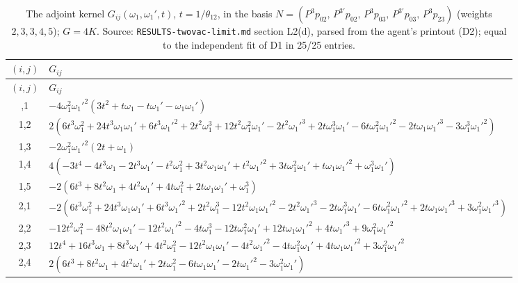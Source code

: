 \documentclass[11pt]{article}
\begin{document}
{\scriptsize
\begin{longtable}{cp{13.5cm}}
\caption{The adjoint kernel $G_{ij}(\omega_1,\omega_1',t)$, $t=1/\theta_{12}$, in the basis $N=(P^3p_{02},\,P^{3\prime}p_{02},\,P^3p_{03},\,P^{3\prime}p_{03},\,P^3p_{23})$ (weights $2,3,3,4,5$); $G=4K$. Source: \texttt{RESULTS-\allowbreak{}twovac-\allowbreak{}limit.\allowbreak{}md} section L2(d), parsed from the agent's printout (D2); equal to the independent fit of D1 in 25/25 entries.}\label{tab:G210}\\
\toprule
$(i,j)$ & $G_{ij}$ \\
\midrule
\endfirsthead
\toprule
$(i,j)$ & $G_{ij}$ \\
\midrule
\endhead
\bottomrule
\endlastfoot
1,1 & $-4 \omega_1^{2} \omega_1'^{2} (3 t^{2} + t \omega_1 - t \omega_1' - \omega_1 \omega_1')$ \\
1,2 & $2 (6 t^{3} \omega_1^{2} + 24 t^{3} \omega_1 \omega_1' + 6 t^{3} \omega_1'^{2} + 2 t^{2} \omega_1^{3} + 12 t^{2} \omega_1^{2} \omega_1' - 2 t^{2} \omega_1'^{3} + 2 t \omega_1^{3} \omega_1' - 6 t \omega_1^{2} \omega_1'^{2} - 2 t \omega_1 \omega_1'^{3} - 3 \omega_1^{3} \omega_1'^{2})$ \\
1,3 & $-2 \omega_1^{2} \omega_1'^{2} (2 t + \omega_1)$ \\
1,4 & $4 (-3 t^{4} - 4 t^{3} \omega_1 - 2 t^{3} \omega_1' - t^{2} \omega_1^{2} + 3 t^{2} \omega_1 \omega_1' + t^{2} \omega_1'^{2} + 3 t \omega_1^{2} \omega_1' + t \omega_1 \omega_1'^{2} + \omega_1^{3} \omega_1')$ \\
1,5 & $-2 (6 t^{3} + 8 t^{2} \omega_1 + 4 t^{2} \omega_1' + 4 t \omega_1^{2} + 2 t \omega_1 \omega_1' + \omega_1^{3})$ \\
2,1 & $-2 (6 t^{3} \omega_1^{2} + 24 t^{3} \omega_1 \omega_1' + 6 t^{3} \omega_1'^{2} + 2 t^{2} \omega_1^{3} - 12 t^{2} \omega_1 \omega_1'^{2} - 2 t^{2} \omega_1'^{3} - 2 t \omega_1^{3} \omega_1' - 6 t \omega_1^{2} \omega_1'^{2} + 2 t \omega_1 \omega_1'^{3} + 3 \omega_1^{2} \omega_1'^{3})$ \\
2,2 & $-12 t^{2} \omega_1^{2} - 48 t^{2} \omega_1 \omega_1' - 12 t^{2} \omega_1'^{2} - 4 t \omega_1^{3} - 12 t \omega_1^{2} \omega_1' + 12 t \omega_1 \omega_1'^{2} + 4 t \omega_1'^{3} + 9 \omega_1^{2} \omega_1'^{2}$ \\
2,3 & $12 t^{4} + 16 t^{3} \omega_1 + 8 t^{3} \omega_1' + 4 t^{2} \omega_1^{2} - 12 t^{2} \omega_1 \omega_1' - 4 t^{2} \omega_1'^{2} - 4 t \omega_1^{2} \omega_1' + 4 t \omega_1 \omega_1'^{2} + 3 \omega_1^{2} \omega_1'^{2}$ \\
2,4 & $2 (6 t^{3} + 8 t^{2} \omega_1 + 4 t^{2} \omega_1' + 2 t \omega_1^{2} - 6 t \omega_1 \omega_1' - 2 t \omega_1'^{2} - 3 \omega_1^{2} \omega_1')$ \\

\end{longtable}}
\end{document}
